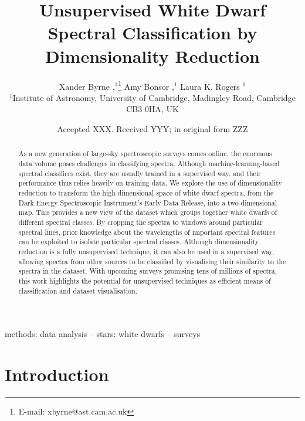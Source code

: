 \documentclass[fleqn,usenatbib]{mnras}
\title[
    Unsupervised WD classification
]{
    Unsupervised White Dwarf Spectral Classification by Dimensionality Reduction
}
\author[
    X. Byrne et al.
]{
    Xander Byrne
    \orcidlink{0000-0001-9488-238X},$^{1}$\thanks{E-mail: xbyrne@ast.cam.ac.uk}
    Amy Bonsor
    \orcidlink{0000-0002-8070-1901},$^{1}$
    Laura K. Rogers
    \orcidlink{0000-0002-3553-9474}$^{1}$
\\
$^{1}$Institute of Astronomy,
University of Cambridge,
Madingley Road,
Cambridge CB3 0HA,
UK
}
\date{Accepted XXX. Received YYY; in original form ZZZ}
\begin{document}
\label{firstpage}
\pagerange{\pageref{firstpage}--\pageref{lastpage}}
\maketitle

\begin{abstract}
As a new generation of large-sky spectroscopic surveys comes online, the enormous data volume poses challenges in classifying spectra.
Although machine-learning-based spectral classifiers exist, they are usually trained in a supervised way, and their performance thus relies heavily on training data.
We explore the use of dimensionality reduction to transform the high-dimensional space of white dwarf spectra, from the Dark Energy Spectroscopic Instrument's Early Data Release, into a two-dimensional map.
This provides a new view of the dataset which groups together white dwarfs of different spectral classes.
By cropping the spectra to windows around particular spectral lines, prior knowledge about the wavelengths of important spectral features can be exploited to isolate particular spectral classes.
Although dimensionality reduction is a fully unsupervised technique, it can also be used in a supervised way, allowing spectra from other sources to be classified by visualising their similarity to the spectra in the dataset.
With upcoming surveys promising tens of millions of spectra, this work highlights the potential for unsupervised techniques as efficient means of classification and dataset visualisation.
\end{abstract}

\begin{keywords}
methods: data analysis -- stars: white dwarfs -- surveys
\end{keywords}



\section{Introduction}
\end{document}

